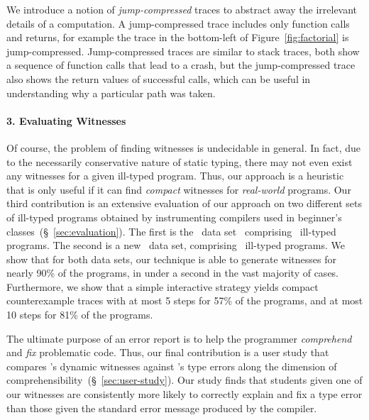 We introduce a notion of \emph{jump-compressed} traces to abstract away
the irrelevant details of a computation.
%
A jump-compressed trace includes only function
calls and returns, for example the trace in the bottom-left of
Figure~\ref{fig:factorial} is jump-compressed.
%
Jump-compressed traces are similar to stack traces, both show a
sequence of function calls that lead to a crash, but the jump-compressed
trace also shows the return values of successful calls, which can be
useful in understanding why a particular path was taken.

\paragraph{3. Evaluating Witnesses}
%
Of course, the problem of finding witnesses is
undecidable in general. In fact, due to the necessarily
conservative nature of static typing, there
may not even exist any witnesses for a given
ill-typed program.
%
Thus, our approach is a heuristic that is only useful
if it can find \emph{compact} witnesses for
\emph{real-world} programs.
%
Our third contribution is an extensive evaluation of our approach
on two different sets of ill-typed programs obtained by instrumenting
compilers used in beginner's classes~(\S~\ref{sec:evaluation}).
%
The first is the \uwbench\ data set~\cite{Lerner2007-dt}
comprising \uwsize\ ill-typed programs.
%
The second is a new \ucsdbench\ data set, comprising \ucsdsize\
ill-typed programs.
%
We show that for both data sets, our technique is able to generate
witnesses for nearly 90\% of the programs, in under a second in the
vast majority of cases.
%
Furthermore, we show that a simple interactive strategy yields
compact counterexample traces with at most 5 steps for 57\%
of the programs, and at most 10 steps for 81\% of the programs.

The ultimate purpose of an error report is to help the programmer
\emph{comprehend} and \emph{fix} problematic code.
%
Thus, our final contribution is a user study that compares \toolname's
dynamic witnesses against \ocaml's type errors along the dimension of
comprehensibility~(\S~\ref{sec:user-study}).
%
Our study finds that students given one of our witnesses are
consistently more likely to correctly explain and fix a type
error than those given the standard error message produced by
the \ocaml compiler.


%
%
%
%
%
%

